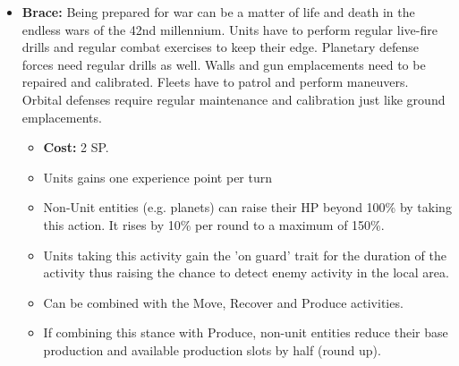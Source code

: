 \begin{itemize}
	\item \textbf{Brace:} Being prepared for war can be a matter of life and death in the endless wars of the 42nd millennium. Units have to perform regular live-fire drills and regular combat exercises to keep their edge. Planetary defense forces need regular drills as well. Walls and gun emplacements need to be repaired and calibrated. Fleets have to patrol and perform maneuvers. Orbital defenses require regular maintenance and calibration just like ground emplacements.
	\begin{itemize}
		\item \textbf{Cost:} 2 SP.
		\item Units gains one experience point per turn
		\item Non-Unit entities (e.g. planets) can raise their HP beyond 100\% by taking this action. It rises by 10\% per round to a maximum of 150\%.
		\item Units taking this activity gain the 'on guard' trait for the duration of the activity thus raising the chance to detect enemy activity in the local area.
		\item Can be combined with the Move, Recover and Produce activities. 
		\item If combining this stance with Produce, non-unit entities reduce their base production and available production slots by half (round up).
	\end{itemize}
	

\end{itemize}

